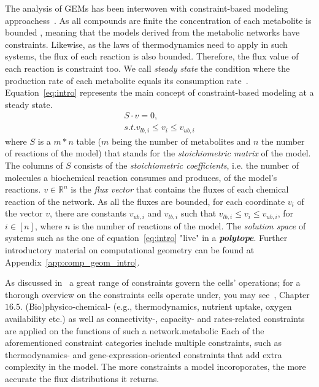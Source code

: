       
      The analysis of GEMs has been interwoven with constraint-based modeling approachess~\citep{lewis2012constraining}.
      As all compounds are finite the concentration of each metabolite is bounded \citep{palsson2015systems}, meaning that the models derived from the
      metabolic networks have constraints.
      Likewise, as the laws of thermodynamics need to apply in such systems, 
      the flux of each reaction is also bounded.
      Therefore, the flux value of each reaction is constraint too.
      We call 
      \textit{steady state} the condition where the production rate of each metabolite equals its consumption rate~\citep{cakmak2012new}. 
      Equation~\ref{eq:intro} represents the main concept of constraint-based modeling at a steady state.
      \begin{equation}
      \label{eq:intro}
         \begin{split}
               S \cdot v = 0 , \\
               s.t.  v_{lb,i} \le v_i \le v_{ub, i}
         \end{split}
       \end{equation}
      where
      $S$ is a $m*n$ table ($m$ being the number of metabolites and $n$ the number of reactions of the model) 
      that stands for the \textit{stoichiometric matrix} of the model.
      The columns of $S$ consists of the  
      \textit{stoichiometric coefficients}, 
      i.e. the number of molecules a biochemical reaction consumes and produces,
      of the model's reactions.          
      $v \in \mathbb{R}^n $ is the \textit{flux vector} that contains the fluxes
      of each chemical reaction of the network. 
      As all the fluxes are bounded, for each coordinate $v_i$ of the vector $v$,
      there are constants $v_{ub, i}$ and  $v_{lb, i}$
      such that $v_{lb,i} \le v_i \le v_{ub, i}$, for $i \in [n]$, 
      where $n$ is the number of reactions of the model.
      The \textit{solution space} of systems such as the one of equation~\ref{eq:intro} 
      "live" in a \textit{\textbf{polytope}}.
      Further introductory material on computational 
      geometry can be found at Appendix~\ref{app:comp_geom_intro}.

      As discussed in~\citep{reed2012shrinking} a great range of constraints 
      govern the cells' operations; for a thorough overview on the constraints cells operate under, you may see~\citep{palsson2015systems}, Chapter $16.5$. 
      (Bio)physico-chemical- (e.g., thermodynamics, nutrient uptake, oxygen availability etc.) as well as connectivity-, capacity- and rates-related constraints 
      are applied on the functions of such a network.metabolic 
      Each of the aforementioned constraint categories include multiple constraints, such as 
      thermodynamics- and gene-expression-oriented constraints that add extra complexity 
      in the model. 
      The more constraints a model incoroporates, the more accurate the flux distributions it returns.

